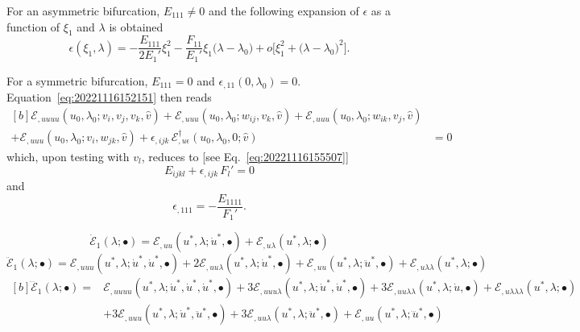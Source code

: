 \documentclass[12pt, final]{scrartcl}
\theoremstyle{definition}
\newcommand{\E}{\mathcal E}
\newcommand{\EE}{\mathcal E ^ \dagger}
\begin{document}
For an asymmetric bifurcation, \(E_{111} \neq 0\) and the following expansion of \(\epsilon\) as a function of \(\xi_1\) and \(\lambda\) is obtained
\begin{equation}
  \epsilon(\xi_1, \lambda) = -\frac{E_{111}}{2E_1'}\xi_1^2-\frac{F_{11}}{E_1'}\xi_1\bigl( \lambda - \lambda_0 \bigr) + o\bigl[ \xi_1^2 + \bigl( \lambda - \lambda_0 \bigr)^2 \bigr].
\end{equation}

For a symmetric bifurcation, \(E_{111} = 0\) and \(\epsilon_{,11}(0, \lambda_0) = 0\). Equation~\eqref{eq:20221116152151} then reads
\begin{equation}
  \begin{aligned}[b]
    \E_{,uuuu}(u_0, \lambda_0; v_i, v_j, v_k, \hat{v}) + \E_{,uuu}(u_0, \lambda_0; w_{ij}, v_k, \hat{v}) + \E_{,uuu}(u_0, \lambda_0; w_{ik}, v_j, \hat{v}) &\\
    + \E_{,uuu}(u_0, \lambda_0; v_i, w_{jk}, \hat{v}) + \epsilon_{,ijk} \, \EE_{,u\epsilon}(u_0, \lambda_0, 0; \hat{v}) &= 0
  \end{aligned}
\end{equation}
which, upon testing with \(v_l\), reduces to [see Eq.~\eqref{eq:20221116155507}]
\begin{equation}
  E_{ijkl} + \epsilon_{,ijk} \, F_l' = 0
\end{equation}
and
\begin{equation}
  \epsilon_{,111} = - \frac{E_{1111}}{F_1'}.
\end{equation}



\begin{equation*}
  \dot{\E}_1(\lambda; \bullet) = \E_{,uu}(u^\ast, \lambda; \dot{u}^\ast, \bullet) + \E_{,u\lambda}(u^\ast, \lambda; \bullet)
\end{equation*}
\begin{equation*}
  \ddot{\E}_1(\lambda; \bullet) = \E_{,uuu}(u^\ast, \lambda; \dot{u}^\ast, \dot{u}^\ast, \bullet) + 2\E_{,uu\lambda}(u^\ast, \lambda; \dot{u}^\ast, \bullet) + \E_{,uu}(u^\ast, \lambda; \ddot{u}^\ast, \bullet) + \E_{,u\lambda\lambda}(u^\ast, \lambda; \bullet)
\end{equation*}
\begin{equation*}
  \begin{aligned}[b]
    \dddot{\E}_1(\lambda; \bullet) ={} & \E_{,uuuu}(u^\ast, \lambda; \dot{u}^\ast, \dot{u}^\ast, \dot{u}^\ast, \bullet) + 3\E_{,uuu\lambda}(u^\ast, \lambda; \dot{u}^\ast, \dot{u}^\ast, \bullet) + 3\E_{,uu\lambda\lambda}(u^\ast, \lambda; \dot{u}, \bullet) + \E_{,u\lambda\lambda\lambda}(u^\ast, \lambda; \bullet)\\
                           &+ 3\E_{,uuu}(u^\ast, \lambda; \dot{u}^\ast, \ddot{u}^\ast, \bullet) + 3\E_{,uu\lambda}(u^\ast, \lambda; \ddot{u}^\ast, \bullet) + \E_{,uu}(u^\ast, \lambda; \dddot{u}^\ast, \bullet)
  \end{aligned}
\end{equation*}
\end{document}
